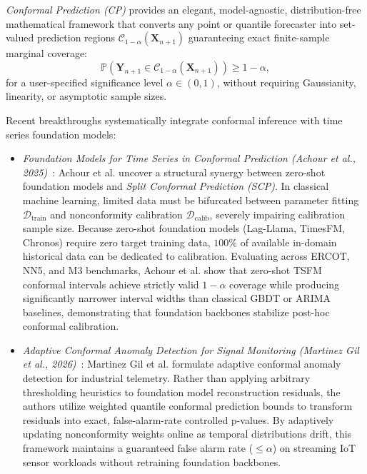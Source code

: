 \emph{Conformal Prediction (CP)} provides an elegant, model-agnostic, distribution-free mathematical framework that converts any point or quantile forecaster into set-valued prediction regions $\mathcal{C}_{1-\alpha}(\mathbf{X}_{n+1})$ guaranteeing exact finite-sample marginal coverage:
\begin{equation}
    \mathbb{P}\left(\mathbf{Y}_{n+1} \in \mathcal{C}_{1-\alpha}(\mathbf{X}_{n+1})\right) \ge 1 - \alpha,
\end{equation}
for a user-specified significance level $\alpha \in (0, 1)$, without requiring Gaussianity, linearity, or asymptotic sample sizes.

Recent breakthroughs systematically integrate conformal inference with time series foundation models:
\begin{itemize}[leftmargin=*]
    \item \emph{Foundation Models for Time Series in Conformal Prediction (Achour et al., 2025)}~\cite{achour2025conformal}: Achour et al. uncover a structural synergy between zero-shot foundation models and \emph{Split Conformal Prediction (SCP)}. In classical machine learning, limited data must be bifurcated between parameter fitting $\mathcal{D}_{\text{train}}$ and nonconformity calibration $\mathcal{D}_{\text{calib}}$, severely impairing calibration sample size. Because zero-shot foundation models (Lag-Llama, TimesFM, Chronos) require zero target training data, $100\%$ of available in-domain historical data can be dedicated to calibration. Evaluating across ERCOT, NN5, and M3 benchmarks, Achour et al. show that zero-shot TSFM conformal intervals achieve strictly valid $1-\alpha$ coverage while producing significantly narrower interval widths than classical GBDT or ARIMA baselines, demonstrating that foundation backbones stabilize post-hoc conformal calibration.
    \item \emph{Adaptive Conformal Anomaly Detection for Signal Monitoring (Martinez Gil et al., 2026)}~\cite{martinezgil2026adaptive}: Martinez Gil et al. formulate adaptive conformal anomaly detection for industrial telemetry. Rather than applying arbitrary thresholding heuristics to foundation model reconstruction residuals, the authors utilize weighted quantile conformal prediction bounds to transform residuals into exact, false-alarm-rate controlled p-values. By adaptively updating nonconformity weights online as temporal distributions drift, this framework maintains a guaranteed false alarm rate ($\le \alpha$) on streaming IoT sensor workloads without retraining foundation backbones.

\end{itemize}
